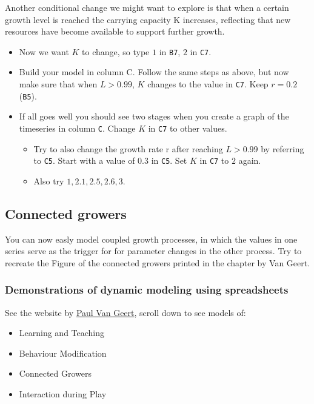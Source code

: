 \documentclass[]{book}
\providecommand{\tightlist}{%
  \setlength{\itemsep}{0pt}\setlength{\parskip}{0pt}}
\begin{document}
Another conditional change we might want to explore is that when a
certain growth level is reached the carrying capacity K increases,
reflecting that new resources have become available to support further
growth.

\begin{itemize}
\item
  Now we want \(K\) to change, so type \(1\) in \texttt{B7}, \(2\) in
  \texttt{C7}.
\item
  Build your model in column C. Follow the same steps as above, but now
  make sure that when \(L > 0.99\), \(K\) changes to the value in
  \texttt{C7}. Keep \(r = 0.2\) (\texttt{B5}).
\item
  If all goes well you should see two stages when you create a graph of
  the timeseries in column \texttt{C}. Change \(K\) in \texttt{C7} to
  other values.

  \begin{itemize}
  \tightlist
  \item
    Try to also change the growth rate r after reaching \(L > 0.99\) by
    referring to \texttt{C5}. Start with a value of \(0.3\) in
    \texttt{C5}. Set \(K\) in \texttt{C7} to \(2\) again.
  \item
    Also try \(1, 2.1, 2.5, 2.6, 3\).
  \end{itemize}
\end{itemize}

\subsection*{Connected growers}\label{connected-growers}

You can now easly model coupled growth processes, in which the values in
one series serve as the trigger for for parameter changes in the other
process. Try to recreate the Figure of the connected growers printed in
the chapter by Van Geert.

\subsubsection{Demonstrations of dynamic modeling using
spreadsheets}\label{demonstrations-of-dynamic-modeling-using-spreadsheets}

See the website by \href{http://www.paulvangeert.nl/research.htm}{Paul
Van Geert}, scroll down to see models of:

\begin{itemize}
\tightlist
\item
  Learning and Teaching
\item
  Behaviour Modification
\item
  Connected Growers
\item
  Interaction during Play
\end{itemize}
\end{document}
